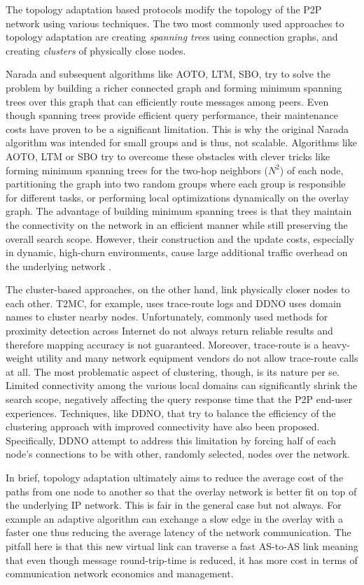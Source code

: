 The topology adaptation based protocols modify the topology of the P2P network
using various techniques. The two most commonly used approaches to 
topology adaptation are creating
\emph{spanning tree}s using connection graphs, and creating \emph{clusters} of
physically close nodes.

Narada and subsequent algorithms like AOTO, LTM, SBO, try to solve the problem
by building a richer connected graph and forming minimum spanning trees over
this graph that can efficiently route messages among peers. Even though spanning
trees provide efficient query performance, their maintenance costs have 
proven to be a significant limitation. This is why the original Narada 
algorithm 
was intended for small
groups and is thus, not scalable.  Algorithms like AOTO, LTM or SBO try to
overcome these obstacles with clever tricks like forming minimum spanning trees
for the two-hop neighbors ($N^2$) of each node, partitioning the graph into two
random groups where each group is responsible for different tasks, or performing
local optimizations dynamically on the overlay graph. The advantage of building
minimum spanning trees is that they maintain the connectivity on the network in
an efficient manner while still preserving the overall search scope. However,
their construction and the update costs, especially in dynamic, high-churn
environments, cause large additional traffic overhead on the underlying
network \cite{CRZ2000,CRSZ2001,CRSZ2002}.

The cluster-based approaches, on the other hand, link physically
closer nodes to each other. T2MC, for example, uses trace-route logs and DDNO
uses domain names to cluster nearby nodes. Unfortunately, commonly used
methods for proximity detection across Internet do not always return
reliable results and therefore mapping accuracy is not guaranteed. Moreover,
trace-route 
is a heavy-weight utility and many network equipment vendors do not allow
trace-route calls at all. The most problematic aspect of clustering, though, is
its nature per se. Limited connectivity among the various local domains can
significantly shrink the search scope, negatively affecting the query response
time that the P2P end-user experiences. Techniques, like DDNO, that try to 
balance the efficiency of the clustering approach with improved
connectivity have also been proposed.  Specifically, DDNO attempt to address this
limitation by forcing half of each node's connections to be with other, randomly
selected, nodes over the network.

In brief, topology adaptation ultimately aims to reduce the 
average cost of the paths from one node to another so that 
the overlay network is better fit on top of the underlying IP network.
This is fair in the general case but not always. For example an
adaptive algorithm can exchange a slow edge in the overlay with a faster one
thus reducing the average latency of the network communication. The pitfall here
is that this new virtual link can traverse a fast AS-to-AS
link meaning that even though message
round-trip-time is reduced, it has more cost in terms of communication network economics
and management.

